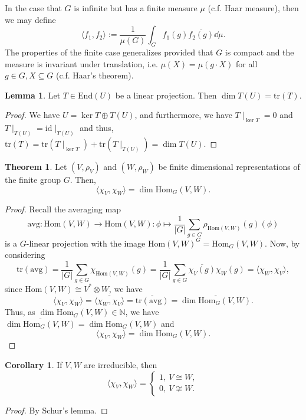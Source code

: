 \documentclass[]{article}
\theoremstyle{definition}
\newtheorem{theorem}{Theorem}
\newtheorem{corollary}{Corollary}[theorem]
\theoremstyle{definition}
\newtheorem{lemma}{Lemma}[section]
\begin{document}
In the case that \(G\) is infinite but has a finite measure \(\mu\) 
(c.f. Haar measure), then we may define 
\[\langle f_1, f_2 \rangle := \frac{1}{\mu(G)} \int_G f_1(g) 
  \overline{f_2(g)} \dd \mu.\]
The properties of the finite case generalizes provided that \(G\) is compact 
and the measure is invariant under translation, i.e. 
\(\mu(X) = \mu(g \cdot X)\) for all \(g \in G, X \subseteq G\) 
(c.f. Haar's theorem).

\begin{lemma}
  Let \(T \in \text{End}(U)\) be a linear projection. Then 
  \(\dim T(U) = \text{tr}(T)\).
\end{lemma}
\begin{proof}
  We have \(U = \ker T \oplus T(U)\), and furthermore, we have 
  \(T\mid_{\ker T} = 0\) and \(T\mid_{T(U)} = \text{id}\mid_{T(U)}\) and thus, 
  \(\text{tr}(T) = \text{tr}(T\mid_{\ker T}) + \text{tr}(T\mid_{T(U)}) = 
    \dim T(U)\).
\end{proof}

\begin{theorem}
  Let \((V, \rho_V)\) and \((W, \rho_W)\) be finite dimensional representations 
  of the finite group \(G\). Then, 
  \[\langle \chi_V, \chi_W \rangle = \dim \text{Hom}_G(V, W).\]
\end{theorem}
\begin{proof}
  Recall the averaging map 
  \[\text{avg} : \text{Hom}(V, W) \to \text{Hom}(V, W) : \phi \mapsto 
    \frac{1}{|G|} \sum_{g \in G} \rho_{\text{Hom}(V, W)} (g)(\phi)\]
  is a \(G\)-linear projection with the image 
  \(\text{Hom}(V, W)^G = \text{Hom}_G(V, W)\). Now, by considering 
  \[\text{tr}(\text{avg}) = \frac{1}{|G|} \sum_{g \in G} \chi_{\text{Hom}(V, W)}(g)
    = \frac{1}{|G|} \sum_{g \in G} \overline{\chi_V(g)}\chi_W(g) = 
    \langle \chi_W, \chi_V \rangle,\]
  since \(\text{Hom}(V, W) \cong V^* \otimes W\), we have 
  \[\langle \chi_V, \chi_W \rangle = \overline{\langle \chi_W, \chi_V \rangle}  
    = \overline{\text{tr}(\text{avg})} = \overline{\dim \text{Hom}_G(V, W)}.\]
  Thus, as \(\dim \text{Hom}_G(V, W) \in \mathbb{N}\), we have 
  \(\overline{\dim \text{Hom}_G(V, W)} = \dim \text{Hom}_G(V, W)\) and 
  \[\langle \chi_V, \chi_W \rangle = \dim \text{Hom}_G(V, W).\]
\end{proof}

\begin{corollary}
  If \(V, W\) are irreducible, then 
  \[\langle \chi_V, \chi_W \rangle = \begin{cases} 
    1, \ V \cong W,\\
    0, \ V \not\cong W.
  \end{cases}\]
\end{corollary}
\begin{proof}
  By Schur's lemma.
\end{proof}
\end{document}
